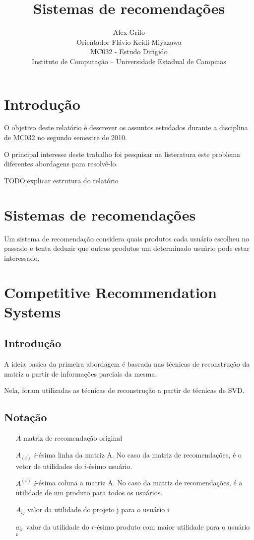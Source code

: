 \documentclass[a4paper,10pt]{article}
\title{Sistemas de recomendações}
\author{Alex Grilo \\ Orientador Flávio Keidi Miyazawa\\ MC032 - Estudo Dirigido \\ \normalsize{Instituto de Computação -- Universidade Estadual de Campinas}}
\begin{document}
\maketitle

\newtheorem{definicao}{Definição}
\newtheorem{lema}{Lema}
\newtheorem{coro}{Corolário}
\newtheorem{teo}{Teorema}


\section{Introdução}

O objetivo deste relatório é descrever os assuntos estudados durante a 
disciplina de MC032 no segundo semestre de 2010. 

O principal interesse deste trabalho foi pesquisar na listeratura este
problema diferentes abordagens para resolvê-lo.

TODO:explicar estrutura do relatório

\section{Sistemas de recomendações}

Um sistema de recomendação considera quais produtos cada usuário
escolheu no passado e tenta deduzir que outros produtos um determinado
usuário pode estar interessado. 


\section{Competitive Recommendation Systems}


\subsection{Introdução}
A ideia basica da primeira abordagem é baseada nas técnicas de 
reconstrução da matriz a partir de informações parciais
da mesma. 

Nela, foram utilizadas as técnicas de reconstrução a partir
de técnicas de SVD.

\subsection{Notação}

\begin{itemize}
\item[$A$] matriz de recomendação original
\item[$A_{(i)}$] $i$-ésima linha da matriz A. No caso da matriz de recomendações, é o vetor de utilidades do $i$-ésimo usuário.
\item[$A^{(i)}$] $i$-ésima coluna a matriz A. No caso da matriz de recomendações, é a utilidade de um produto para todos os usuários.
\item[$A_{ij}$] valor da utilidade do projeto j para o usuário i
\item[$a_{ir}$] valor da utilidade do $r$-ésimo produto com maior utilidade para o usuário $i$ 
\end{itemize}
\end{document}
